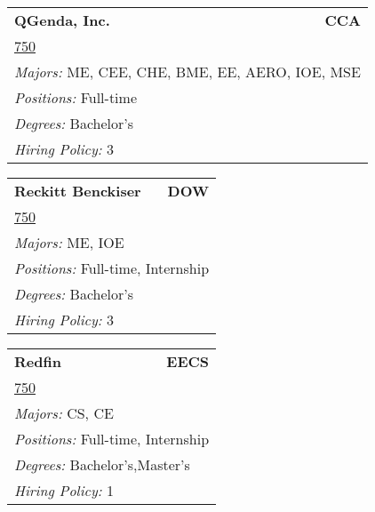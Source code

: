 \documentclass[twoside]{article}
\begin{document}
\begin{center}
\begin{multicols}{3}
\begin{FlushLeft}
\begin{minipage}{\columnwidth}
\end{minipage}
 
\begin{minipage}{\columnwidth}\begin{tabularx}{.95\columnwidth}{Xr}
                 {\Large\bf QGenda, Inc.} & {\Large\bf CCA}\\
    \multicolumn{2}{p{.95\columnwidth}}{\url{750}}\\
    \multicolumn{2}{p{.95\columnwidth}}{\emph{Majors:} ME, CEE, CHE, BME, EE, AERO, IOE, MSE}\\
    \multicolumn{2}{p{.95\columnwidth}}{\emph{Positions:} Full-time}\\
    \multicolumn{2}{p{.95\columnwidth}}{\emph{Degrees:} Bachelor's}\\
    \multicolumn{2}{p{.95\columnwidth}}{\emph{Hiring Policy:} 3}\\
    \end{tabularx}
    
\end{minipage}
 
\begin{minipage}{\columnwidth}\begin{tabularx}{.95\columnwidth}{Xr}
                 {\Large\bf Reckitt Benckiser} & {\Large\bf DOW}\\
    \multicolumn{2}{p{.95\columnwidth}}{\url{750}}\\
    \multicolumn{2}{p{.95\columnwidth}}{\emph{Majors:} ME, IOE}\\
    \multicolumn{2}{p{.95\columnwidth}}{\emph{Positions:} Full-time, Internship}\\
    \multicolumn{2}{p{.95\columnwidth}}{\emph{Degrees:} Bachelor's}\\
    \multicolumn{2}{p{.95\columnwidth}}{\emph{Hiring Policy:} 3}\\
    \end{tabularx}
    
\end{minipage}
 
\begin{minipage}{\columnwidth}\begin{tabularx}{.95\columnwidth}{Xr}
                 {\Large\bf Redfin} & {\Large\bf EECS}\\
    \multicolumn{2}{p{.95\columnwidth}}{\url{750}}\\
    \multicolumn{2}{p{.95\columnwidth}}{\emph{Majors:} CS, CE}\\
    \multicolumn{2}{p{.95\columnwidth}}{\emph{Positions:} Full-time, Internship}\\
    \multicolumn{2}{p{.95\columnwidth}}{\emph{Degrees:} Bachelor's,Master's}\\
    \multicolumn{2}{p{.95\columnwidth}}{\emph{Hiring Policy:} 1}\\
    \end{tabularx}
    

\end{minipage}
\end{FlushLeft}
\end{multicols}
\end{center}
\end{document}
